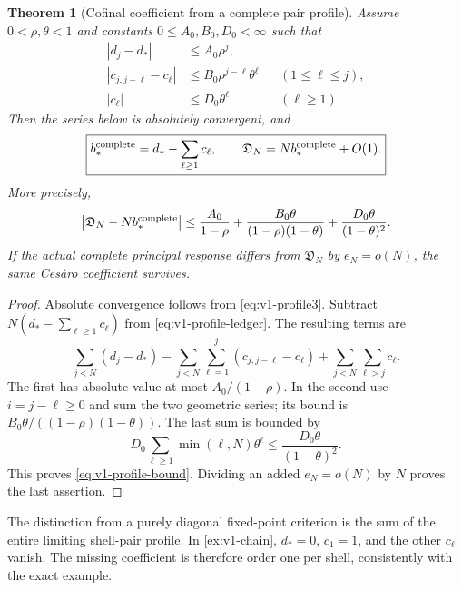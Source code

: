 \documentclass[11pt,a4paper]{article}
\newtheorem{theorem}{Theorem}[section]
\theoremstyle{definition}
\theoremstyle{remark}
\begin{document}
\begin{theorem}[Cofinal coefficient from a complete pair profile]
\label{thm:v1-profile}
Assume $0<\rho,\theta<1$ and constants $0\le A_0,B_0,D_0<\infty$ such that
\begin{align}
 |d_j-d_*|&\le A_0\rho^j,\label{eq:v1-profile1}\\
 |c_{j,j-\ell}-c_\ell|&\le B_0\rho^{j-\ell}\theta^\ell
                         &&(1\le\ell\le j),\label{eq:v1-profile2}\\
 |c_\ell|&\le D_0\theta^\ell &&(\ell\ge1).\label{eq:v1-profile3}
\end{align}
Then the series below is absolutely convergent, and
\begin{equation}\label{eq:v1-bstar}
 \boxed{\displaystyle
 b_*^{\rm complete}=d_*-\sum_{\ell\ge1}c_\ell,\qquad
 \mathfrak D_N=Nb_*^{\rm complete}+O(1).}
\end{equation}
More precisely,
\begin{equation}\label{eq:v1-profile-bound}
 \left|\mathfrak D_N-Nb_*^{\rm complete}\right|
 \le \frac{A_0}{1-\rho}
    +\frac{B_0\theta}{(1-\rho)(1-\theta)}
    +\frac{D_0\theta}{(1-\theta)^2}.
\end{equation}
If the actual complete principal response differs from
$\mathfrak D_N$ by $e_N=o(N)$, the same Ces\`aro coefficient survives.
\end{theorem}
\begin{proof}
Absolute convergence follows from \cref{eq:v1-profile3}. Subtract
$N(d_*-\sum_{\ell\ge1}c_\ell)$ from
\cref{eq:v1-profile-ledger}. The resulting terms are
\[
 \sum_{j<N}(d_j-d_*)
 -\sum_{j<N}\sum_{\ell=1}^j(c_{j,j-\ell}-c_\ell)
 +\sum_{j<N}\sum_{\ell>j}c_\ell.
\]
The first has absolute value at most $A_0/(1-\rho)$. In the second use
$i=j-\ell\ge0$ and sum the two geometric series; its bound is
$B_0\theta/((1-\rho)(1-\theta))$. The last sum is bounded by
\[
 D_0\sum_{\ell\ge1}\min(\ell,N)\theta^\ell
                \le \frac{D_0\theta}{(1-\theta)^2}.
\]
This proves \cref{eq:v1-profile-bound}. Dividing an added $e_N=o(N)$ by
$N$ proves the last assertion.
\end{proof}

The distinction from a purely diagonal fixed-point criterion is the
sum of the entire limiting shell-pair profile. In
\cref{ex:v1-chain}, $d_*=0$, $c_1=1$, and the other $c_\ell$ vanish.
The missing coefficient is therefore order one per shell, consistently
with the exact example.
\end{document}
